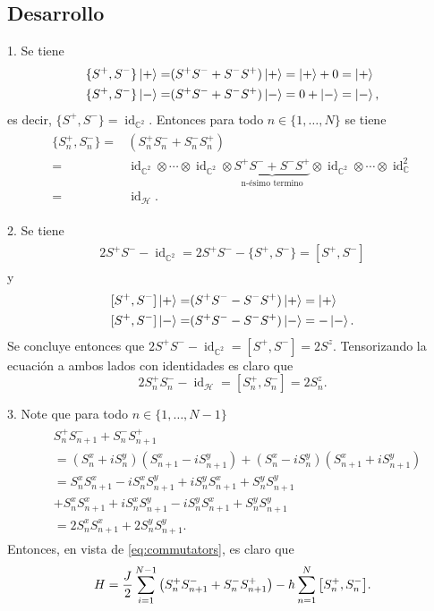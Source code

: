 \documentclass{article}
\DeclareMathOperator{\id}{id}
\begin{document}
\subsection{Desarrollo}

1. Se tiene
\begin{align}
\begin{split}
\{S^+,S^-\}\ket{+}=&(S^+S^-+S^-S^+)\ket{+}=\ket{+}+0=\ket{+}\\
\{S^+,S^-\}\ket{-}=&(S^+S^-+S^-S^+)\ket{-}=0+\ket{-}=\ket{-},
\end{split}
\end{align}
es decir, $\{S^+,S^-\}=\id_{\mathbb{C}^2}$. Entonces para todo $n\in\{1,\dots,N\}$ se tiene
\begin{align}\label{eq:anti-commutator}
\begin{split}
\{S^+_n,S^-_n\}=&(S_n^+S_n^-+S_n^-S_n^+)\\
=&\id_{\mathbb{C}^2}\otimes\cdots\otimes\id_{\mathbb{C}^2}\otimes\underbrace{S^+S^-+S^-S^+}_{\text{n-ésimo termino}}\otimes\id_{\mathbb{C}^2}\otimes\cdots\otimes\id_\mathbb{C}^2\\
=&\id_\mathcal{H}.
\end{split}
\end{align}

2. Se tiene
\begin{align}
\begin{split}
2S^+S^--\id_{\mathbb{C}^2}=2S^+S^--\{S^+,S^-\}=[S^+,S^-] 
\end{split}
\end{align}
y 
\begin{align}
\begin{split}
[S^+,S^-]\ket{+}=&(S^+S^--S^-S^+)\ket{+}=\ket{+}\\
[S^+,S^-]\ket{-}=&(S^+S^--S^-S^+)\ket{-}=-\ket{-}.
\end{split}
\end{align}
Se concluye entonces que $2S^+S^--\id_{\mathbb{C}^2}=[S^+,S^-]=2S^z$. Tensorizando la ecuación a ambos lados con identidades es claro que
\begin{equation}\label{eq:commutators}
2S^+_nS^-_n-\id_\mathcal{H}=[S^+_n,S^-_n]=2S^z_n.
\end{equation}

3. Note que para todo $n\in\{1,\dots,N-1\}$
\begin{align}
\begin{split}
&S_n^+S_{n+1}^-+S_n^-S_{n+1}^+\\
&=(S_n^x+iS_n^y)(S_{n+1}^x-iS_{n+1}^y)+(S_n^x-iS_n^y)(S_{n+1}^x+iS_{n+1}^y)\\
&=S_n^xS_{n+1}^x-iS_n^xS_{n+1}^y+iS_n^yS_{n+1}^x+S_n^yS_{n+1}^y\\
&+S_n^xS_{n+1}^x+iS_n^xS_{n+1}^y-iS_n^yS_{n+1}^x+S_n^yS_{n+1}^y\\
&=2S_n^xS_{n+1}^x+2S_n^yS_{n+1}^y.
\end{split}
\end{align}
Entonces, en vista de \eqref{eq:commutators}, es claro que 
\begin{equation}\label{eq:hamiltoniano}
H=\frac{J}{2}\sum_{i=1}^{N-1}\qty(S_n^+S_{n+1}^-+S_n^-S_{n+1}^+)-h\sum_{n=1}^N\qty[S_n^+,S_n^-].
\end{equation}
\end{document}

